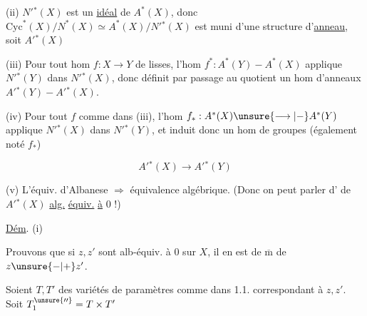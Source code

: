 (ii) $N'{}^*(X)$ est un \uline{idéal} de $A^*(X)$, donc $\mathrm{Cyc}^*(X)/N^*(X)\simeq A^*(X)/N'{}^*(X)$ est muni d'une structure d'\uline{anneau}, soit $A'{}^*(X)$

(iii) Pour tout hom $f:X\longrightarrow Y$ de  lisses, l'hom $f^*:A^*(Y)-A^*(X)$ applique $N'{}^*(Y)$ dans $N'{}^*(X)$, donc définit par passage au quotient un hom d'anneaux $A'{}^*(Y)-A'{}^*(X)$.

(iv) Pour tout $f$ comme dans (iii),  l'hom  $f_*:A^*(X)\unsure{\longrightarrow|-}A^*(Y)$  applique $N'{}^*(X)$ dans $N'{}^*(Y)$, et induit donc un hom de groupes (également noté $f_*$)

\[
A'{}^*(X)\longrightarrow A'{}^*(Y)
\]

(v) L'équiv. d'Albanese $\Longrightarrow$ équivalence algébrique. (Donc on peut parler d' de $A'{}^*(X)$ \uline{alg.} \uline{équiv.} \uline{à} $0$ !)

\uline{Dém}. (i)  

Prouvons que si $z,z'$ sont alb-équiv. à $0$ sur $X$, il en est de $\overline{\mathrm m}$ de $z\unsure{-|+}z'$.

Soient $T,T'$ des variétés de paramètres comme dans 1.1. correspondant à $z,z'$. Soit $T_{1}^{\unsure{\prime\prime}}=T\times T'$

